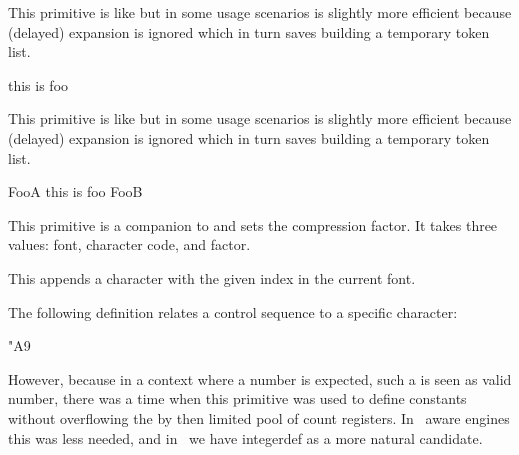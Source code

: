\stopnewprimitive

\startnewprimitive[title={\prm {cdef}}]

This primitive is like  but in some usage scenarios is slightly
more efficient because (delayed) expansion is ignored which in turn saves
building a temporary token list.

\startbuffer
\edef\FooA{this is foo} \meaningfull\FooA\crlf
\cdef{} \meaningfull\FooB\par
\stopbuffer

\typebuffer {\tttf \getbuffer}

\stopnewprimitive

\startnewprimitive[title={\prm {cdefcsname}}]

This primitive is like  but in some usage scenarios is slightly
more efficient because (delayed) expansion is ignored which in turn saves
building a temporary token list.

\startbuffer
\edefcsname FooA \meaningasis\FooA\crlf
\cdefcsname FooB \meaningasis\FooB\par
\stopbuffer

\typebuffer {\tttf \getbuffer}

\stopnewprimitive

\startnewprimitive[title={\prm {cfcode}}]

This primitive is a companion to  and sets the compression factor.
It takes three values: font, character code, and factor.

\stopnewprimitive

\startoldprimitive[title={\prm {char}}]

This appends a character with the given index in the current font.

\stopoldprimitive

\startoldprimitive[title={\prm {chardef}}]

The following definition relates a control sequence to a specific character:

\starttyping
\chardef\copyrightsign"A9
\stoptyping

However, because in a context where a number is expected, such a 
is seen as valid number, there was a time when this primitive was used to define
constants without overflowing the by then limited pool of count registers. In
\ETEX\ aware engines this was less needed, and in \LUAMETATEX\ we have \prm
{integerdef} as a more natural candidate.

